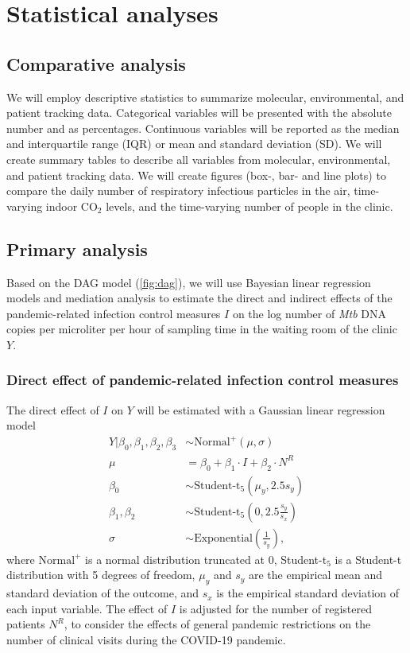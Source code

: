 \documentclass{article}
\begin{document}
\section{Statistical analyses}

\subsection{Comparative analysis}

We will employ descriptive statistics to summarize molecular, environmental, and patient tracking data. Categorical variables will be presented with the absolute number and as percentages. Continuous variables will be reported as the median and interquartile range (IQR) or mean and standard deviation (SD). We will create summary tables to describe all variables from molecular, environmental, and patient tracking data. We will create figures (box-, bar- and line plots) to compare the daily number of respiratory infectious particles in the air, time-varying indoor CO$_2$ levels, and the time-varying number of people in the clinic.

\subsection{Primary analysis}

Based on the DAG model (\cref{fig:dag}), we will use Bayesian linear regression models and mediation analysis to estimate the direct and indirect effects of the pandemic-related infection control measures $I$ on the log number of \emph{Mtb} DNA copies per microliter per hour of sampling time in the waiting room of the clinic $Y$. 

\subsubsection*{Direct effect of pandemic-related infection control measures}

The direct effect of $I$ on $Y$ will be estimated with a Gaussian linear regression model
\begin{align*}
    Y | \beta_0, \beta_1, \beta_2, \beta_3 &\sim \text{Normal}^{+}(\mu, \sigma) \\
    \mu &= \beta_0 + \beta_1 \cdot I + \beta_2 \cdot N^R \\
    \beta_0 &\sim \text{Student-t}_5(\mu_y, 2.5s_{y}) \\
    \beta_1, \beta_2 &\sim \text{Student-t}_5\left(0, 2.5\frac{s_{y}}{s_{x}}\right) \\
    \sigma &\sim \text{Exponential}\left(\frac{1}{s_{y}}\right),
\end{align*}
where $\text{Normal}^{+}$ is a normal distribution truncated at $0$, Student-t$_5$ is a Student-t distribution with 5 degrees of freedom, $\mu_{y}$ and $s_{y}$ are the empirical mean and standard deviation of the outcome, and $s_x$ is the empirical standard deviation of each input variable. The effect of $I$ is adjusted for the number of registered patients $N^R$, to consider the effects of general pandemic restrictions on the number of clinical visits during the COVID-19 pandemic. 
\end{document}
